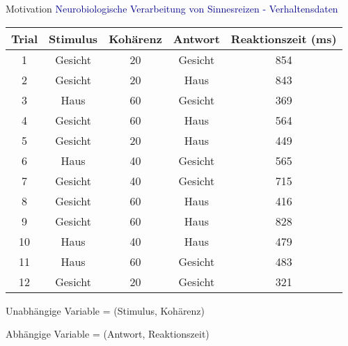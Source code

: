 \documentclass[
  8pt,
  ignorenonframetext,
]{beamer}
\begin{document}
\begin{frame}{Motivation}
\protect\hypertarget{motivation-2}{}
\textcolor{darkblue}{Neurobiologische Verarbeitung von Sinnesreizen - Verhaltensdaten}

\footnotesize

\begin{longtable}[]{@{}ccccc@{}}
\toprule()
Trial & Stimulus & Kohärenz & Antwort & Reaktionszeit (ms) \\
\midrule()
\endhead
1 & Gesicht & 20 & Gesicht & 854 \\
2 & Gesicht & 20 & Haus & 843 \\
3 & Haus & 60 & Gesicht & 369 \\
4 & Gesicht & 60 & Haus & 564 \\
5 & Gesicht & 20 & Haus & 449 \\
6 & Haus & 40 & Gesicht & 565 \\
7 & Gesicht & 40 & Gesicht & 715 \\
8 & Gesicht & 60 & Haus & 416 \\
9 & Gesicht & 60 & Haus & 828 \\
10 & Haus & 40 & Haus & 479 \\
11 & Haus & 60 & Gesicht & 483 \\
12 & Gesicht & 20 & Gesicht & 321 \\
\bottomrule()
\end{longtable}

\normalsize
\center

Unabhängige Variable = (Stimulus, Kohärenz)

Abhängige Variable = (Antwort, Reaktionszeit)
\end{frame}
\end{document}
